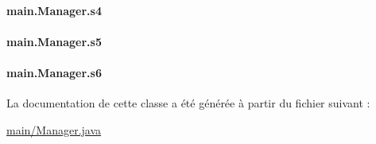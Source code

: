 \paragraph[{s4}]{ main.\+Manager.\+s4\hspace{0.3cm}{\ttfamily [package]}}\label{classmain_1_1Manager_a9735c9ed38407fa5cc20623372807a01}
\hypertarget{classmain_1_1Manager_abc0528186764144b702030cdbcb409df}{}
\paragraph[{s5}]{ main.\+Manager.\+s5\hspace{0.3cm}{\ttfamily [package]}}\label{classmain_1_1Manager_abc0528186764144b702030cdbcb409df}
\hypertarget{classmain_1_1Manager_a32e046e37c048665d90d769f3e0b0bac}{}
\paragraph[{s6}]{ main.\+Manager.\+s6\hspace{0.3cm}{\ttfamily [package]}}\label{classmain_1_1Manager_a32e046e37c048665d90d769f3e0b0bac}


La documentation de cette classe a été générée à partir du fichier suivant \+:\begin{DoxyCompactItemize}
\item 
\hyperlink{main_2Manager_8java}{main/\+Manager.\+java}\end{DoxyCompactItemize}
